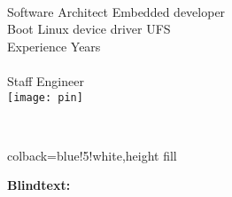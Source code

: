 \documentclass[a4paper]{chirri} %
\newcommand*{\localLocPin}{%
  \texttt{[image: pin]}%
}
\begin{document}
\layout                    %

\begin{headingbox}[skin=bicolor,colbacklower=yellow,lower separated=true]
   \UserName{} \\
   Software Architect \textbullet Embedded developer \\
   \textbullet Boot \textbullet Linux device driver \textbullet UFS  \\
   Experience \UserExperience{} Years    \\
   \UserMobile{} \textbullet \space \UserEmailID{}
%
%
\tcblower
   \CurrentCompany{} \\
   Staff Engineer  \\
   {\Large{\localLocPin}}{} \UserLocation{}
%
%
\end{headingbox}
\\[2\baselineskip]

\begin{masterbox}{colback=blue!5!white,height fill}

\end{masterbox}

\lipsum[1-3]
\textbf{Blindtext:}
\Blindtext
\end{document}
